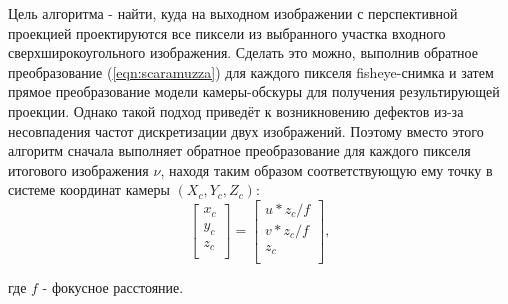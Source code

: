 Цель алгоритма - найти, куда на выходном изображении  с  перспективной проекцией проектируются все пиксели из 
выбранного участка входного сверхширокоугольного изображения. Сделать это можно, выполнив обратное преобразование 
(\ref{eqn:scaramuzza}) для каждого пикселя fisheye-снимка и затем прямое преобразование модели камеры-обскуры 
для получения результирующей проекции. Однако такой подход приведёт к возникновению дефектов из-за несовпадения %
частот дискретизации двух изображений.  Поэтому вместо этого алгоритм сначала выполняет обратное преобразование  для 
каждого пикселя итогового изображения $\nu$, находя таким образом соответствующую ему точку в системе координат 
камеры $({X_c, Y_c, Z_c})$:
\vskip 12pt
\begin{equation}
    \label{eq:uv_to_xyz}
    \left[\begin{matrix}x_c\\y_c\\z_c\\\end{matrix}\right] = \left[\begin{matrix} {u*z_c}/f \\  {v*z_c}/f \\ z_c \\\end{matrix}\right],
\end{equation} 
\vskip 24pt

где  $f$ - фокусное расстояние. 

